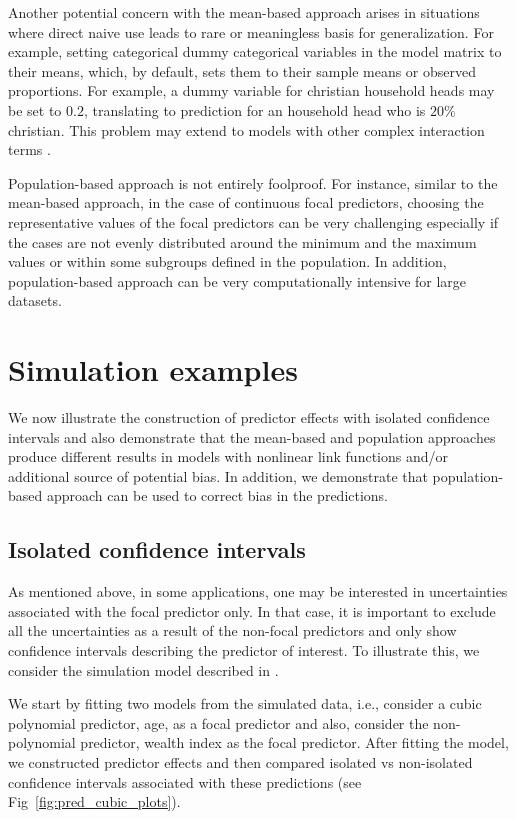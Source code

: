 \documentclass[10pt,letterpaper]{article}
\begin{document}
Another potential concern with the mean-based approach arises in situations where direct naive use leads to rare or meaningless basis for generalization. For example, setting categorical dummy categorical variables in the model matrix to their means, which, by default, sets them to their sample means or observed proportions. For example, a dummy variable for christian household heads may be set to $0.2$, translating to prediction for an household head who is $20\%$ christian. This problem may extend to models with other complex interaction terms \cite{hanmer2013behind}.

Population-based approach is not entirely foolproof. For instance, similar to the mean-based approach, in the case of continuous focal predictors, choosing the representative values of the focal predictors can be very challenging especially if the cases are not evenly distributed around the minimum and the maximum values or within some subgroups defined in the population. In addition, population-based approach can be very computationally intensive for large datasets.

\section*{Simulation examples}

We now illustrate the construction of predictor effects with isolated confidence intervals and also demonstrate that the mean-based and population approaches produce different results in models with nonlinear link functions and/or additional source of potential bias. In addition, we demonstrate that population-based approach can be used to correct bias in the predictions.

\subsection*{Isolated confidence intervals}

As mentioned above, in some applications, one may be interested in uncertainties associated with the focal predictor only. In that case, it is important to exclude all the uncertainties as a result of the non-focal predictors and only show confidence intervals describing the predictor of interest. To illustrate this, we consider the simulation model described in . 

We start by fitting two models from the simulated data, i.e., consider a cubic polynomial predictor, age, as a focal predictor and also, consider the non-polynomial predictor, wealth index as the focal predictor. After fitting the model, we constructed predictor effects and then compared isolated vs non-isolated confidence intervals associated with these predictions (see Fig~\ref{fig:pred_cubic_plots}).
\end{document}
